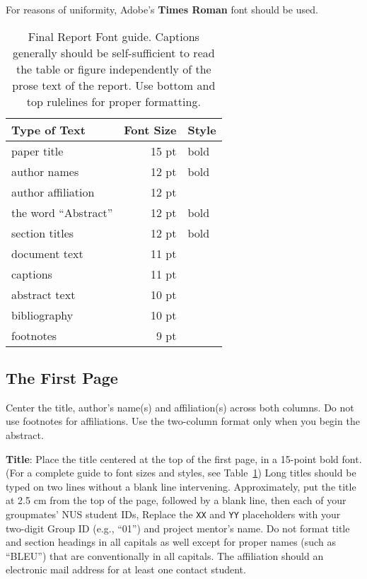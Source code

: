 \documentclass[11pt]{article}
\begin{document}
For reasons of uniformity, Adobe's {\bf Times Roman} font should be
used. 

\begin{table}[h]
\begin{center}
\begin{tabular}{|l|rl|}
\hline \bf Type of Text & \bf Font Size & \bf Style \\ \hline
paper title & 15 pt & bold \\
author names & 12 pt & bold \\
author affiliation & 12 pt & \\
the word ``Abstract'' & 12 pt & bold \\
section titles & 12 pt & bold \\
document text & 11 pt  &\\
captions & 11 pt & \\
abstract text & 10 pt & \\
bibliography & 10 pt & \\
footnotes & 9 pt & \\
\hline
\end{tabular}
\end{center}
\caption{\label{font-table} Final Report Font guide. Captions generally should be self-sufficient to read the table or figure independently of the prose text of the report.  Use bottom and top rulelines for proper formatting.}
\end{table}

\subsection{The First Page}
\label{ssec:first}

Center the title, author's name(s) and affiliation(s) across both
columns. Do not use footnotes for affiliations. Use the
two-column format only when you begin the abstract.

{\bf Title}: Place the title centered at the top of the first page, in
a 15-point bold font. (For a complete guide to font sizes and styles,
see Table~\ref{font-table}) Long titles should be typed on two lines
without a blank line intervening. Approximately, put the title at 2.5
cm from the top of the page, followed by a blank line, then each of your groupmates' NUS student IDs,  Replace the {\tt XX} and {\tt YY} placeholders with your two-digit Group ID (e.g., ``01'') and project mentor's name.  Do not format title and section headings in all
capitals as well except for proper names (such as ``BLEU'') that are
conventionally in all capitals.  The affiliation should an electronic mail address for at least one contact student.  
\end{document}
